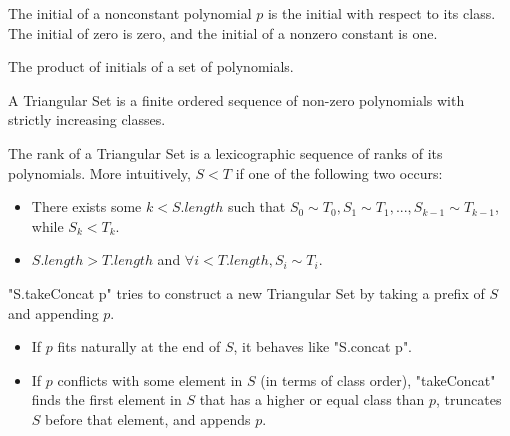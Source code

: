 \begin{definition}
    \label{def:initial}
    \leanok
    The initial of a nonconstant polynomial $p$ is the initial with respect to its class.
    The initial of zero is zero, and the initial of a nonzero constant is one.
\end{definition}

\begin{definition}
    \label{def:initialProd}
    \leanok
    The product of initials of a set of polynomials.
\end{definition}

\begin{definition}
    \label{def:TriangularSet}
    \leanok
    A Triangular Set is a finite ordered sequence of non-zero polynomials with strictly increasing classes.
\end{definition}

\begin{definition}
    \label{def:TriangularSet.rank}
    \leanok
    The rank of a Triangular Set is a lexicographic sequence of ranks of its polynomials.
    More intuitively, $S < T$ if one of the following two occurs:
    \begin{itemize}
        \item There exists some $k < S.length$ such that $S_0 \sim T_0, S_1 \sim T_1, ..., S_{k-1} \sim T_{k-1}$, while $S_k < T_k$.
        \item $S.length > T.length$ and $\forall i < T.length, S_i \sim T_i$.
    \end{itemize}
\end{definition}

\begin{definition}
    \label{def:takeConcat}
    \leanok
    "S.takeConcat p" tries to construct a new Triangular Set by taking a prefix of $S$ and appending $p$.
    \begin{itemize}
    \item If $p$ fits naturally at the end of $S$, it behaves like "S.concat p".
    \item If $p$ conflicts with some element in $S$ (in terms of class order), "takeConcat" finds the
        first element in $S$ that has a higher or equal class than $p$, truncates $S$ before that element, and appends $p$.
    \end{itemize}
\end{definition}

